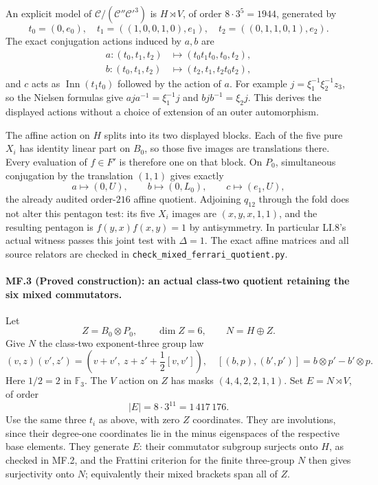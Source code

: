 An explicit model of
$\mathcal C/(\mathcal C''\mathcal C'^3)$ is
$H\rtimes V$, of order $8\cdot3^5=1944$, generated by
\[
 t_0=(0,e_0),\quad
 t_1=((1,0,0,1,0),e_1),\quad
 t_2=((0,1,1,0,1),e_2).
\]
The exact conjugation actions induced by $a,b$ are
\[
 \begin{split}
 a:(t_0,t_1,t_2)&\longmapsto(t_0t_1t_0,t_0,t_2),\\
 b:(t_0,t_1,t_2)&\longmapsto(t_2,t_1,t_2t_0t_2),
 \end{split}
\]
and $c$ acts as $\operatorname{Inn}(t_1t_0)$ followed by
the action of $a$. For example
$j=\xi_1^{-1}\xi_2^{-1}z_3$, so the Nielsen formulas give
$aja^{-1}=\xi_1^{-1}j$ and $bjb^{-1}=\xi_2j$.
This derives the displayed actions without a choice of
extension of an outer automorphism.

The affine action on $H$ splits into its two displayed
blocks. Each of the five pure $X_i$ has identity linear
part on $B_0$, so those five images are translations
there. Every evaluation of $f\in F'$ is therefore one on
that block. On $P_0$, simultaneous conjugation by the
translation $(1,1)$ gives exactly
\[
           a\mapsto(0,U),\qquad b\mapsto(0,L_0),
                    \qquad c\mapsto(e_1,U),
\]
the already audited order-$216$ affine quotient.
Adjoining $q_{12}$ through the fold does not alter this
pentagon test: its five $X_i$ images are
$(x,y,x,1,1)$, and the resulting pentagon is
$f(y,x)f(x,y)=1$ by antisymmetry.
In particular LI.8's actual witness passes this joint
test with $\Delta=1$. The exact affine matrices and all
source relators are checked in
\texttt{check\_mixed\_ferrari\_quotient.py}.

\paragraph{MF.3 (Proved construction): an actual class-two quotient
retaining the six mixed commutators.}
Let
\[
 Z=B_0\otimes P_0,\qquad\dim Z=6,
 \qquad N=H\oplus Z.
\]
Give $N$ the class-two exponent-three group law
\[
 (v,z)(v',z')=
 \left(v+v',\ z+z'+\frac12[v,v']\right),
 \quad
 [(b,p),(b',p')]=b\otimes p'-b'\otimes p.
\]
Here $1/2=2$ in $\mathbb F_3$.
The $V$ action on $Z$ has masks $(4,4,2,2,1,1)$.
Set $E=N\rtimes V$, of order
\[
                         |E|=8\cdot3^{11}=1\,417\,176.
\]
Use the same three $t_i$ as above, with zero $Z$
coordinates. They are involutions, since their degree-one
coordinates lie in the minus eigenspaces of the respective
base elements. They generate $E$: their commutator subgroup
surjects onto $H$, as checked in MF.2, and the Frattini
criterion for the finite three-group $N$ then gives
surjectivity onto $N$; equivalently their mixed brackets
span all of $Z$.

